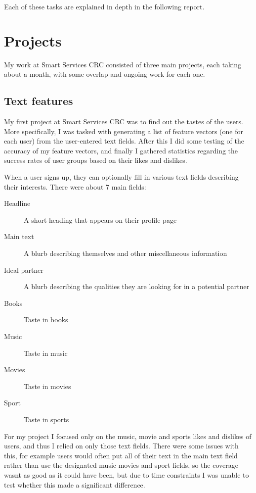 \documentclass{report}
\begin{document}
Each of these tasks are explained in depth in the following report.


\chapter{Projects}
My work at Smart Services CRC consisted of three main projects, each taking about a month, with some overlap and ongoing work for each one.

\section{Text features}

My first project at Smart Services CRC was to find out the tastes of the users. More specifically, I was tasked with generating a list of feature vectors (one for each user) from the user-entered text fields. After this I did some testing of the accuracy of my feature vectors, and finally I gathered statistics regarding the success rates of user groups based on their likes and dislikes.

When a user signs up, they can optionally fill in various text fields describing their interests. There were about 7 main fields:
\begin{description}
  \item[Headline] A short heading that appears on their profile page
  \item[Main text] A blurb describing themselves and other miscellaneous information
  \item[Ideal partner] A blurb describing the qualities they are looking for in a potential partner
  \item[Books] Taste in books
  \item[Music] Taste in music
  \item[Movies] Taste in movies
  \item[Sport] Taste in sports
\end{description}

For my project I focused only on the music, movie and sports likes and dislikes of users, and thus I relied on only those text fields. There were some issues with this, for example users would often put all of their text in the main text field rather than use the designated music movies and sport fields, so the coverage wasnt as good as it could have been, but due to time constraints I was unable to test whether this made a significant difference.
\end{document}
